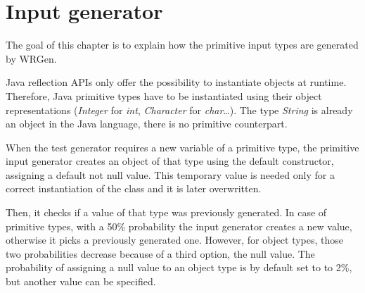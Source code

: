 \section{Input generator}\label{sec:pig}
The goal of this chapter is to explain how the primitive input types are generated by WRGen.

Java reflection APIs only offer the possibility to instantiate objects at runtime. Therefore, Java primitive types have to be instantiated using their object representations (\emph{Integer} for \emph{int}, \emph{Character} for \emph{char}\dots). The type \emph{String} is already an object in the Java language, there is no primitive counterpart.

When the test generator requires a new variable of a primitive type, the primitive input generator creates an object of that type using the default constructor, assigning a default not null value. This temporary value is needed only for a correct instantiation of the class and it is later overwritten.

Then, it checks if a value of that type was previously generated. In case of primitive types, with a 50\% probability the input generator creates a new value, otherwise it picks a previously generated one. However, for object types, those two probabilities decrease because of a third option, the null value. The probability of assigning a null value to an object type is by default set to to 2\%, but another value can be specified.

